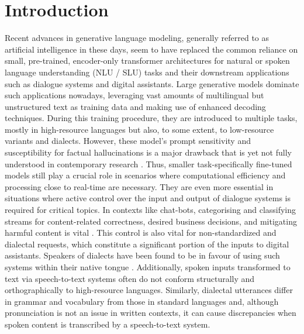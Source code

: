 \documentclass[11pt,a4paper,twoside,openright]{scrbook}
\begin{document}
\listoffigures


\listoftables

\newpage






\chapter{Introduction}

\setcounter{page}{1} %

Recent advances in generative language modeling, generally referred to as artificial intelligence in these days, seem to have replaced the common reliance on small, pre-trained, encoder-only transformer architectures for natural or spoken language understanding (NLU / SLU) tasks and their downstream applications such as dialogue systems and digital assistants. Large generative models dominate such applications nowadays, leveraging vast amounts of multilingual but unstructured text as training data and making use of enhanced decoding techniques. During this training procedure, they are introduced to multiple tasks, mostly in high-resource languages but also, to some extent, to low-resource variants and dialects. However, these model's prompt sensitivity and susceptibility for factual hallucinations is a major drawback that is yet not fully understood in contemporary research \citep{leidinger-etal-2023-language}.
Thus, smaller task-specifically fine-tuned models still play a crucial role in scenarios where computational efficiency and processing close to real-time are necessary. They are even more essential in situations where active control over the input and output of dialogue systems is required for critical topics. In contexts like chat-bots, categorising and classifying streams for content-related correctness, desired business decisions, and mitigating harmful content is vital \citep{jurafsky_martin_processing}.
This control is also vital for non-standardized and dialectal requests, which constitute a significant portion of the inputs to digital assistants. Speakers of dialects have been found to be in favour of using such systems within their native tongue \citep{blaschke2024dialectsurvey}. Additionally, spoken inputs transformed to text via speech-to-text systems often do not conform structurally and orthographically to high-resource languages. Similarly, dialectal utterances differ in grammar and vocabulary from those in standard languages and, although pronunciation is not an issue in written contexts, it can cause discrepancies when spoken content is transcribed by a speech-to-text system.
\end{document}
